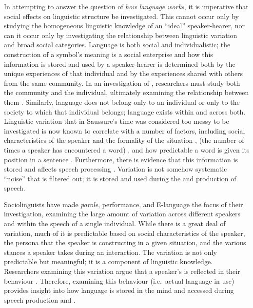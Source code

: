 In attempting to answer the question of \textit{how language works}, it is imperative that social effects on linguistic structure be investigated. This cannot occur only by studying the homogeneous linguistic knowledge of an ``ideal'' speaker-hearer, nor can it occur only by investigating the relationship between linguistic variation and broad social categories. Language is both social and individualistic; the construction of a symbol's meaning is a social enterprise and how this information is stored and used by a speaker-hearer is determined both by the unique experiences of that individual and by the experiences shared with others from the same community. In an investigation of , researchers must study both the community and the individual, ultimately examining the relationship between them \citep[146]{wenger1998}. Similarly, language does not belong only to an individual or only to the society to which that individual belongs; language exists within and across both. Linguistic variation that in Saussure's time was considered too messy to be investigated is now known to correlate with a number of factors, including social characteristics of the speaker and the formality of the situation \citep{labov1972sociolingpatterns},  (the number of times a speaker has encountered a word) \citep{bybee2002}, and how predictable a word is given its position in a sentence \citep{jurafskyetal2002}. Furthermore, there is evidence that this information is stored and affects speech processing \citep{strand1999,jurafsky2003}. Variation is not somehow systematic ``noise'' that is filtered out; it is stored and used during the  and production of speech.

Sociolinguists have made \textit{parole}, performance, and E-language the focus of their investigation, examining the large amount of variation across different speakers and within the speech of a single individual. While there is a great deal of variation, much of it is predictable based on social characteristics of the speaker, the persona that the speaker is constructing in a given situation, and the various stances a speaker takes during an interaction. The variation is not only predictable but meaningful; it is a component of linguistic knowledge. Researchers examining this variation argue that a speaker's  is reflected in their behaviour \citep{hymes1972}. Therefore, examining this behaviour (i.e.~actual language in use) provides insight into how language is stored in the mind and accessed during speech production and . 

